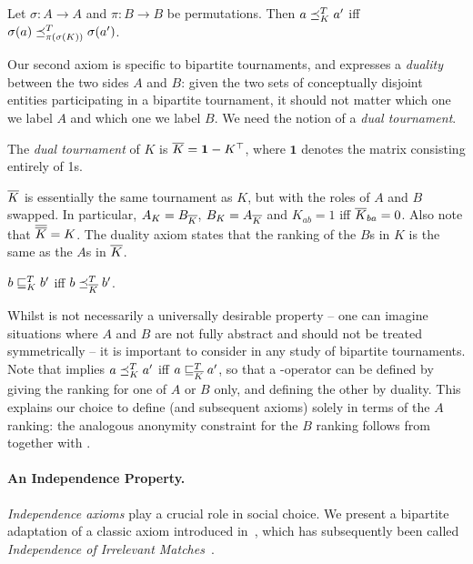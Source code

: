 \begin{axiom}[\anon{}]
    Let $\sigma:A \to A$ and $\pi:B \to B$ be permutations. Then $a \preceq_K^T
    a'$ iff $\sigma(a) \preceq_{\pi(\sigma(K))}^T \sigma(a')$.
\end{axiom}

Our second axiom is specific to bipartite tournaments, and expresses a
\emph{duality} between the two sides $A$ and $B$: given the two sets of
conceptually disjoint entities participating in a bipartite tournament, it
should not matter which one we label $A$ and which one we label $B$. We need
the notion of a \emph{dual tournament}.

\begin{definition}%

    The \emph{dual tournament} of $K$ is ${\overline{K}} = \bm{1} - K^\top$, where
    $\bm{1}$ denotes the matrix consisting entirely of 1s.

\end{definition}

${\overline{K}}$ is essentially the same tournament as $K$, but with the roles of $A$
and $B$ swapped. In particular, $A_K = B_{\overline{K}}$, $B_K = A_{\overline{K}}$ and
$K_{ab} = 1$ iff ${\overline{K}}_{ba} = 0$. Also note that ${\overline{{\overline{K}}}} = K$.
The duality axiom states that the ranking of the $B$s in $K$ is the same as the
$A$s in ${\overline{K}}$.

\begin{axiom}[\dualaxiom{}]
    $b \sqsubseteq_K^T b'$ iff $b \preceq_{\overline{K}}^T b'$.
\end{axiom}

Whilst \dualaxiom{} is not necessarily a universally desirable property --
one can imagine situations where $A$ and $B$ are not fully abstract and should
not be treated symmetrically -- it is important to consider in any study of
bipartite tournaments. Note that \dualaxiom{} implies $a \preceq_K^T
a'$ iff $a \sqsubseteq_{{\overline{K}}}^T a'$, so that a \dualaxiom{}-operator can be
defined by giving the ranking for one of $A$ or $B$ only, and defining the
other by duality. This explains our choice to define \anon{} (and
subsequent axioms) solely in terms of the $A$ ranking: the analogous anonymity
constraint for the $B$ ranking follows from \anon{} together with
\dualaxiom{}.

\paragraph{An Independence Property.}
%
\emph{Independence axioms} play a crucial role in social choice. We present a
bipartite adaptation of a classic axiom introduced
in~\cite{rubinstein1980ranking}, which has subsequently been called
\emph{Independence of Irrelevant Matches}~\cite{gonzalez2014paired}.

